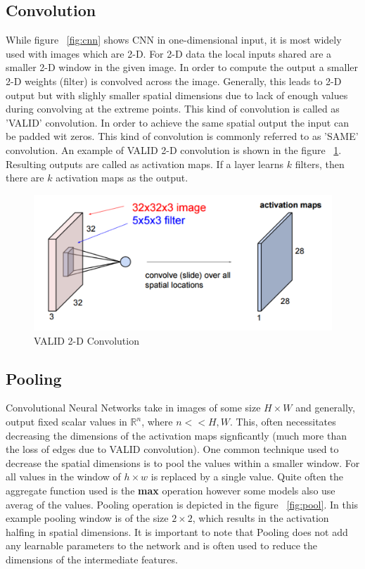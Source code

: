\subsection{Convolution}

While figure ~\ref{fig:cnn} shows CNN in one-dimensional input, it is most widely used with images which are 2-D.
For 2-D data the local inputs shared are a smaller 2-D window in the given image. 
In order to compute the output a smaller 2-D weights (filter) is convolved across the image. 
Generally, this leads to 2-D output but with slighly smaller spatial dimensions due to lack of enough values during convolving at the extreme points. This kind of convolution is called as 'VALID' convolution. In order to achieve the same spatial output the input can be padded wit zeros. This kind of convolution is commonly referred to as 'SAME' convolution. An example of VALID 2-D convolution is shown in the figure ~\ref{fig:cnn2d}. Resulting outputs are called as activation maps. If a layer learns $k$ filters, then there are $k$ activation maps as the output.


\begin{figure}[H]
	\centering
   \includegraphics[scale=0.39]{figures/intro/cnn2d.png}
   \caption[2-D Convolution]{VALID 2-D Convolution}
   \label{fig:cnn2d}
\end{figure}

\subsection{Pooling}

Convolutional Neural Networks take in images of some size $H \times W$ and generally, output fixed scalar values in $\mathbb{R}^n$, where $n << H, W$. This, often necessitates decreasing the dimensions of the activation maps signficantly (much more than the loss of edges due to VALID convolution). One common technique used to decrease the spatial dimensions is to pool the values within a smaller window. For all values in the window of $h \times w$ is replaced by a single value. Quite often the aggregate function used is the \textbf{max} operation however some models also use averag of the values. Pooling operation is depicted in the figure ~\ref{fig:pool}. In this example pooling window is of the size $2\times2$, which results in the activation halfing in spatial dimensions. 
It is important to note that Pooling does not add any learnable parameters to the network and is often used to reduce the dimensions of the intermediate features.

